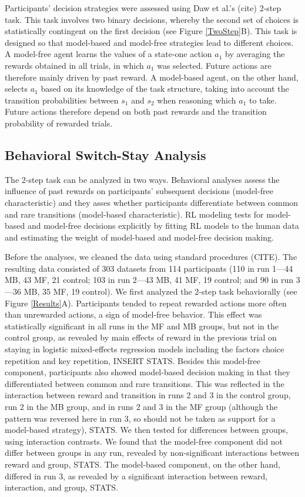 \documentclass[11pt]{article} %
\begin{document}
Participants' decision strategies were assessed using Daw et al.'s (cite) 2-step task. This task involves two binary decisions, whereby the second set of choices is statistically contingent on the first decision (see Figure \ref{TwoStep}B). This task is designed so that model-based and model-free strategies lead to different choices. A model-free agent learns the values of a state-one action $a_{1}$ by averaging the rewards obtained in all trials, in which $a_{1}$ was selected. Future actions are therefore mainly driven by past reward. A model-based agent, on the other hand, selects $a_{1}$ based on its knowledge of the task structure, taking into account the transition probabilities between $s_{1}$ and $s_{2}$ when reasoning which $a_{1}$ to take. Future actions therefore depend on both past rewards and the transition probability of rewarded trials.

\subsection{Behavioral Switch-Stay Analysis}
The 2-step task can be analyzed in two ways. Behavioral analyses assess the influence of past rewards on participants' subsequent decisions (model-free characteristic) and they asses whether participants differentiate between common and rare transitions (model-based characteristic). RL modeling tests for model-based and model-free decisions explicitly by fitting RL models to the human data and estimating the weight of model-based and model-free decision making.

Before the analyses, we cleaned the data using standard procedures (CITE). The resulting data consisted of 303 datasets from 114 participants (110 in run 1---44 MB, 43 MF, 21 control; 103 in run 2---43 MB, 41 MF, 19 control; and 90 in run 3---36 MB, 35 MF, 19 control). We first analyzed the 2-step task behaviorally (see Figure \ref{Results}A). Participants tended to repeat rewarded actions more often than unrewarded actions, a sign of model-free behavior. This effect was statistically significant in all runs in the MF and MB groups, but not in the control group, as revealed by main effects of reward in the previous trial on staying in logistic mixed-effects regression models including the factors choice repetition and key repetition, INSERT STATS. Besides this model-free component, participants also showed model-based decision making in that they differentiated between common and rare transitions. This was reflected in the interaction between reward and transition in runs 2 and 3 in the control group, run 2 in the MB group, and in runs 2 and 3 in the MF group (although the pattern was reversed here in run 3, so should not be taken as support for a model-based strategy), STATS. We then tested for differences between groups, using interaction contrasts. We found that the model-free component did not differ between groups in any run, revealed by non-significant interactions between reward and group, STATS. The model-based component, on the other hand, differed in run 3, as revealed by a significant interaction between reward, interaction, and group, STATS.
\end{document}
